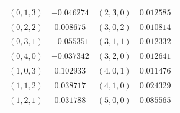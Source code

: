 \begin{table}
\begin{tabular}{cc@{\qquad}cc}
$(0,1,3)$ & $-0.046274$ & $(2,3,0)$ & $0.012585$ \\
$(0,2,2)$ & $0.008675$ & $(3,0,2)$ & $0.010814$ \\
$(0,3,1)$ & $-0.055351$ & $(3,1,1)$ & $0.012332$ \\
$(0,4,0)$ & $-0.037342$ & $(3,2,0)$ & $0.012641$ \\
$(1,0,3)$ & $0.102933$ & $(4,0,1)$ & $0.011476$ \\
$(1,1,2)$ & $0.038717$ & $(4,1,0)$ & $0.024329$ \\
$(1,2,1)$ & $0.031788$ & $(5,0,0)$ & $0.085565$ \\
\hline
\end{tabular}
\end{table}

